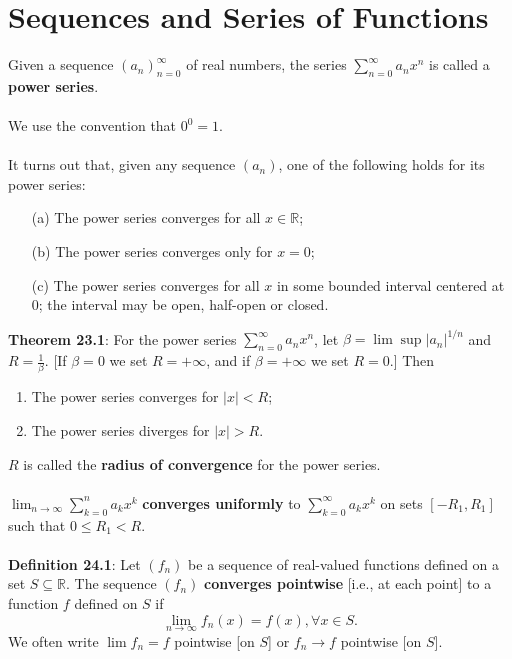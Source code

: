 \documentclass{article}
\theoremstyle{definition}
\DeclareMathOperator{\Sup}{sup}
\begin{document}
\section*{Sequences and Series of Functions}
Given a sequence $(a_n)^\infty_{n = 0}$ of real numbers, the series $\sum_{n = 0}^\infty a_nx^n$ is called a \textbf{power series}. \\ \\
We use the convention that $0^0 = 1$. \\ \\
It turns out that, given any sequence $(a_n)$, one of the following
holds for its power series: \begin{enumerate}
    \item[(a)] The power series converges for all $x \in \mathbb{R}$;
    \item[(b)] The power series converges only for $x = 0$;
    \item[(c)] The power series converges for all $x$ in some bounded interval centered at 0; the interval may be open, half-open or closed.
\end{enumerate} $ $ \\
\textbf{Theorem 23.1}: For the power series $\sum_{n = 0}^\infty a_nx^n$, let $\beta = \lim \Sup |a_n|^{1/n}$ and $R = \frac{1}{\beta}$. [If $\beta = 0$ we set $R = +\infty$, and if $\beta = +\infty$ we set $R = 0$.] Then \begin{enumerate}
    \item The power series converges for $|x| < R$;
    \item The power series diverges for $|x| > R$.
\end{enumerate} $ $ \\
$R$ is called the \textbf{radius of convergence} for the power series. \\ \\
$\lim_{n \rightarrow \infty} \sum_{k = 0}^n a_kx^k$ \textbf{converges uniformly} to $\sum_{k = 0}^\infty a_kx^k$ on sets $[-R_1, R_1]$ such that $0 \leq R_1 < R$. \\ \\
\textbf{Definition 24.1}: Let $(f_n)$ be a sequence of real-valued functions defined on a set $S \subseteq \mathbb{R}$. The sequence $(f_n)$ \textbf{converges pointwise} [i.e., at each point] to a function $f$ defined on $S$ if $$\lim_{n \rightarrow \infty} f_n(x) = f(x), \forall x \in S.$$ We often write $\lim f_n = f$ pointwise [on $S$] or $f_n \rightarrow f$ pointwise [on $S$]. \\ \\
\end{document}
